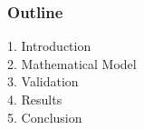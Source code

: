 
\maketitle

\begin{frame}
 \frametitle{Outline}
  \vspace{-1cm}
  1. Introduction\\[0.1cm]
  2. Mathematical Model\\[0.1cm]
  3. Validation\\[0.1cm]
  4. Results\\[0.1cm]
  5. Conclusion
\end{frame}



